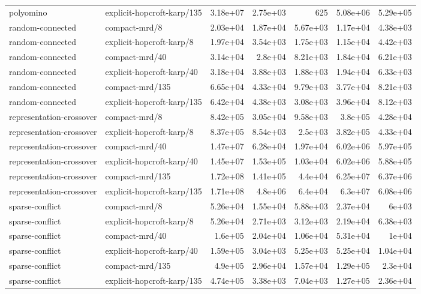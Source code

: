 \begin{table}[t]
\begin{tabular}{llrrrrr}
polyomino & explicit-hopcroft-karp/135 & 3.18e+07 & 2.75e+03 & 625 & 5.08e+06 & 5.29e+05 \\
random-connected & compact-mrd/8 & 2.03e+04 & 1.87e+04 & 5.67e+03 & 1.17e+04 & 4.38e+03 \\
random-connected & explicit-hopcroft-karp/8 & 1.97e+04 & 3.54e+03 & 1.75e+03 & 1.15e+04 & 4.42e+03 \\
random-connected & compact-mrd/40 & 3.14e+04 & 2.8e+04 & 8.21e+03 & 1.84e+04 & 6.21e+03 \\
random-connected & explicit-hopcroft-karp/40 & 3.18e+04 & 3.88e+03 & 1.88e+03 & 1.94e+04 & 6.33e+03 \\
random-connected & compact-mrd/135 & 6.65e+04 & 4.33e+04 & 9.79e+03 & 3.77e+04 & 8.21e+03 \\
random-connected & explicit-hopcroft-karp/135 & 6.42e+04 & 4.38e+03 & 3.08e+03 & 3.96e+04 & 8.12e+03 \\
representation-crossover & compact-mrd/8 & 8.42e+05 & 3.05e+04 & 9.58e+03 & 3.8e+05 & 4.28e+04 \\
representation-crossover & explicit-hopcroft-karp/8 & 8.37e+05 & 8.54e+03 & 2.5e+03 & 3.82e+05 & 4.33e+04 \\
representation-crossover & compact-mrd/40 & 1.47e+07 & 6.28e+04 & 1.97e+04 & 6.02e+06 & 5.97e+05 \\
representation-crossover & explicit-hopcroft-karp/40 & 1.45e+07 & 1.53e+05 & 1.03e+04 & 6.02e+06 & 5.88e+05 \\
representation-crossover & compact-mrd/135 & 1.72e+08 & 1.41e+05 & 4.4e+04 & 6.25e+07 & 6.37e+06 \\
representation-crossover & explicit-hopcroft-karp/135 & 1.71e+08 & 4.8e+06 & 6.4e+04 & 6.3e+07 & 6.08e+06 \\
sparse-conflict & compact-mrd/8 & 5.26e+04 & 1.55e+04 & 5.88e+03 & 2.37e+04 & 6e+03 \\
sparse-conflict & explicit-hopcroft-karp/8 & 5.26e+04 & 2.71e+03 & 3.12e+03 & 2.19e+04 & 6.38e+03 \\
sparse-conflict & compact-mrd/40 & 1.6e+05 & 2.04e+04 & 1.06e+04 & 5.31e+04 & 1e+04 \\
sparse-conflict & explicit-hopcroft-karp/40 & 1.59e+05 & 3.04e+03 & 5.25e+03 & 5.25e+04 & 1.04e+04 \\
sparse-conflict & compact-mrd/135 & 4.9e+05 & 2.96e+04 & 1.57e+04 & 1.29e+05 & 2.3e+04 \\
sparse-conflict & explicit-hopcroft-karp/135 & 4.74e+05 & 3.38e+03 & 7.04e+03 & 1.27e+05 & 2.36e+04 \\

\end{tabular}
\end{table}
